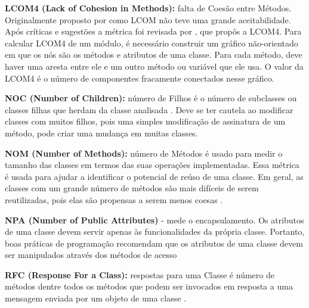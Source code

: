  \vspace{\onelineskip} 

\textbf{LCOM4 (Lack of Cohesion in Methods):} falta de Coesão entre Métodos. Originalmente
proposto por  como LCOM não teve uma
grande aceitabilidade. Após críticas e sugestões a métrica foi revisada por , que propôs a LCOM4. Para calcular LCOM4 de um módulo, é
necessário construir um gráfico não-orientado em que os nós são os métodos e atributos
de uma classe. Para cada método, deve haver uma aresta entre ele e um outro
método ou variável que ele usa. O valor da LCOM4 é o número de componentes
fracamente conectados nesse gráfico.


 \vspace{\onelineskip} 

\textbf{NOC (Number of Children):} número de Filhos é o número de subclasses ou classes
filhas que herdam da classe analisada \cite{Rosenberg97}. Deve se ter
cautela ao modificar classes com muitos filhos, pois uma simples modificação de
assinatura de um método, pode criar uma mudança em muitas classes.


 \vspace{\onelineskip} 

\textbf{NOM (Number of Methods):} número de Métodos é usado para medir o tamanho
das classes em termos das suas operações implementadas. Essa métrica é usada para
ajudar a identificar o potencial de reúso de uma classe. Em geral, as classes com
um grande número de métodos são mais difíceis de serem reutilizadas, pois elas são
propensas a serem menos coesas \cite{Lorenz94}.


 \vspace{\onelineskip} 

\textbf{NPA (Number of Public Attributes)} - mede o encapsulamento. Os atributos de uma classe devem servir apenas às funcionalidades da própria classe. Portanto, boas práticas de programação recomendam que os atributos de uma classe devem ser manipulados através dos métodos de acesso \cite{beck1997smalltalk}



 \vspace{\onelineskip} 

\textbf{RFC (Response For a Class):} respostas para uma Classe é número de métodos
dentre todos os métodos que podem ser invocados em resposta a uma mensagem
enviada por um objeto de uma classe \cite{Sharble93}.



